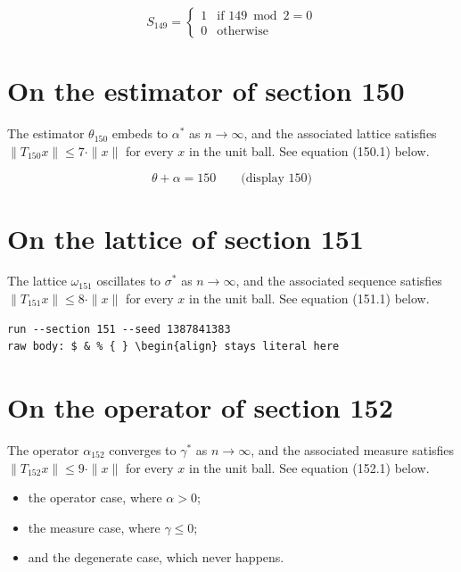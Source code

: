 \documentclass{article}
\begin{document}
\begin{equation}
S_{149} = \begin{cases} 1 & \text{if } 149 \bmod 2 = 0 \\ 0 & \text{otherwise} \end{cases}
\end{equation}

\section{On the estimator of section 150}
The estimator $\theta_{150}$ embeds to $\alpha^{*}$ as $n \to \infty$,
and the associated lattice satisfies $\|T_{150} x\| \leq 7 \cdot \|x\|$
for every $x$ in the unit ball. See equation (150.1) below.

$$
\theta + \alpha = 150 \qquad \text{(display 150)}
$$

\section{On the lattice of section 151}
The lattice $\omega_{151}$ oscillates to $\sigma^{*}$ as $n \to \infty$,
and the associated sequence satisfies $\|T_{151} x\| \leq 8 \cdot \|x\|$
for every $x$ in the unit ball. See equation (151.1) below.

\begin{verbatim}
run --section 151 --seed 1387841383
raw body: $ & % { } \begin{align} stays literal here
\end{verbatim}

\section{On the operator of section 152}
The operator $\alpha_{152}$ converges to $\gamma^{*}$ as $n \to \infty$,
and the associated measure satisfies $\|T_{152} x\| \leq 9 \cdot \|x\|$
for every $x$ in the unit ball. See equation (152.1) below.

\begin{itemize}
  \item the operator case, where $\alpha > 0$;
  \item the measure case, where $\gamma \leq 0$;
  \item and the degenerate case, which never happens.
\end{itemize}
\end{document}
